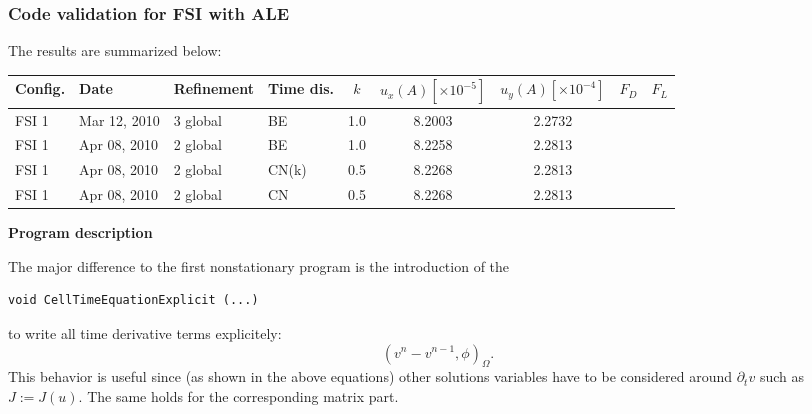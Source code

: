 \subsubsection{Code validation for FSI with ALE}

The results are summarized below:

 \begin{table}[h]
   \small
   \centering
     \begin{tabular}{llllccccc}    
       \hline
       Config. & Date & Refinement & Time dis. & $k$ &  $u_x(A) [\times 10^{-5}]$ &$u_y(A) [\times 10^{-4}]$ & $F_D$ & $F_L$  \\ \hline
       FSI 1   & Mar 12, 2010 & 3 global & BE   & 1.0 & 8.2003  & 2.2732  & &        \\
       FSI 1   & Apr 08, 2010 & 2 global & BE   & 1.0 & 8.2258  & 2.2813  & &        \\
       FSI 1   & Apr 08, 2010 & 2 global & CN(k)& 0.5 & 8.2268  & 2.2813  & &        \\
       FSI 1   & Apr 08, 2010 & 2 global & CN   & 0.5 & 8.2268  & 2.2813  & &        \\
     \end{tabular}
  \end{table}

\vspace{0.2cm}

\textbf{Program description}

The major difference to the first nonstationary program
is the introduction of the 
\begin{verbatim}
void CellTimeEquationExplicit (...) 
\end{verbatim}
to write all time derivative terms explicitely:
\begin{equation*}
(v^n - v^{n-1}, \phi)_{\Omega}.
\end{equation*}
This behavior is useful since (as shown in the above equations)
other solutions variables have to be considered
around $\partial_t v$ such as $J:=J(u)$. 
The same holds for the corresponding matrix part.


\vspace{0.2cm}
